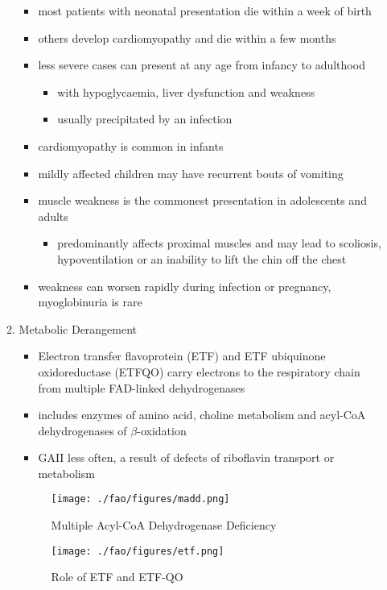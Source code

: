 \documentclass{scrartcl}
\begin{document}
\begin{enumerate}
\begin{enumerate}
\begin{itemize}
\item most patients with neonatal presentation die within a week of birth
\item others develop cardiomyopathy and die within a few months
\item less severe cases can present at any age from infancy to adulthood
\begin{itemize}
\item with hypoglycaemia, liver dysfunction and weakness
\item usually precipitated by an infection
\end{itemize}
\item cardiomyopathy is common in infants
\item mildly affected children may have recurrent bouts of vomiting
\item muscle weakness is the commonest presentation in adolescents and adults
\begin{itemize}
\item predominantly affects proximal muscles and may lead to scoliosis,
hypoventilation or an inability to lift the chin off the chest
\end{itemize}
\item weakness can worsen rapidly during infection or pregnancy, myoglobinuria is rare
\end{itemize}

\item Metabolic Derangement
\label{sec:org716467c}
\begin{itemize}
\item Electron transfer flavoprotein (ETF) and ETF ubiquinone
oxidoreductase (ETFQO) carry electrons to the respiratory chain from
multiple FAD-linked dehydrogenases
\item includes enzymes of amino acid, choline metabolism and acyl-CoA
dehydrogenases of \(\beta\)-oxidation
\item GAII less often, a result of defects of riboflavin transport or
metabolism
\end{itemize}

\begin{figure}[htbp]
\centering
\texttt{[image: ./fao/figures/madd.png]}
\caption{\label{fig:org9c6c52b}
Multiple Acyl-CoA Dehydrogenase Deficiency}
\end{figure}

\begin{figure}[htbp]
\centering
\texttt{[image: ./fao/figures/etf.png]}
\caption{\label{fig:org2b9ae33}
Role of ETF and ETF-QO}
\end{figure}


\end{enumerate}
\end{enumerate}
\end{document}

